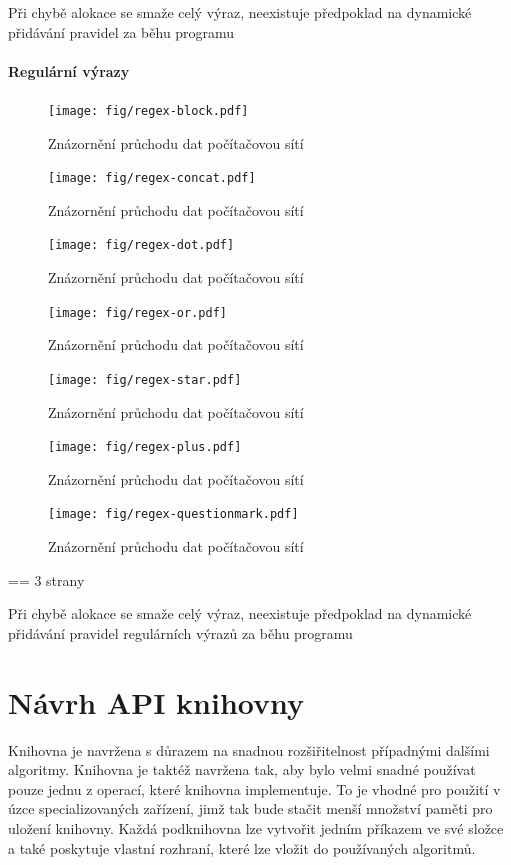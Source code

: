 Při chybě alokace se smaže celý výraz, neexistuje předpoklad na dynamické přidávání pravidel za běhu programu

\subsubsection{Regulární výrazy}

\begin{figure}[!htb]
\centering
\texttt{[image: fig/regex-block.pdf]}
\caption{Znázornění průchodu dat počítačovou sítí}
\label{fig:regex-block}
\end{figure}

\begin{figure}[!htb]
\centering
\texttt{[image: fig/regex-concat.pdf]}
\caption{Znázornění průchodu dat počítačovou sítí}
\label{fig:regex-concat}
\end{figure}

\begin{figure}[!htb]
\centering
\texttt{[image: fig/regex-dot.pdf]}
\caption{Znázornění průchodu dat počítačovou sítí}
\label{fig:regex-dot}
\end{figure}

\begin{figure}[!htb]
\centering
\texttt{[image: fig/regex-or.pdf]}
\caption{Znázornění průchodu dat počítačovou sítí}
\label{fig:regex-or}
\end{figure}

\begin{figure}[!htb]
\centering
\texttt{[image: fig/regex-star.pdf]}
\caption{Znázornění průchodu dat počítačovou sítí}
\label{fig:regex-star}
\end{figure}

\begin{figure}[!htb]
\centering
\texttt{[image: fig/regex-plus.pdf]}
\caption{Znázornění průchodu dat počítačovou sítí}
\label{fig:regex-plus}
\end{figure}

\begin{figure}[!htb]
\centering
\texttt{[image: fig/regex-questionmark.pdf]}
\caption{Znázornění průchodu dat počítačovou sítí}
\label{fig:regex-questionmark}
\end{figure}
== 3 strany

Při chybě alokace se smaže celý výraz, neexistuje předpoklad na dynamické přidávání pravidel
regulárních výrazů za běhu programu

\chapter{Návrh API knihovny}
Knihovna je navržena s důrazem na snadnou rozšiřitelnost případnými dalšími algoritmy.
Knihovna je taktéž navržena tak, aby bylo velmi snadné používat pouze jednu z operací, které knihovna implementuje.
To je vhodné pro použití v úzce specializovaných zařízení, jimž tak bude stačit menší množství paměti pro uložení knihovny.
Každá podknihovna lze vytvořit jedním příkazem ve své složce a také poskytuje vlastní rozhraní, které lze vložit do používaných algoritmů.

